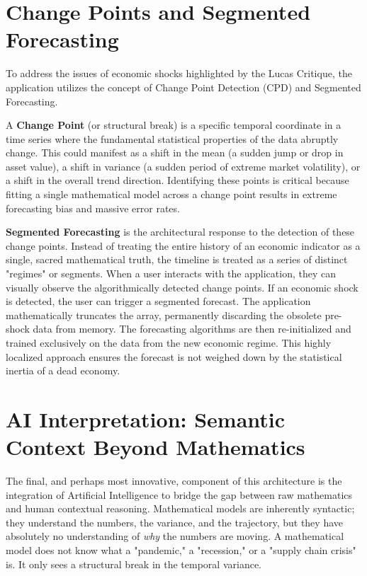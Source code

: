 \documentclass[11pt, a4paper]{report}
\begin{document}
\section{Change Points and Segmented Forecasting}
To address the issues of economic shocks highlighted by the Lucas Critique, the application utilizes the concept of Change Point Detection (CPD) \cite{BaiPerron1998} and Segmented Forecasting. 

A \textbf{Change Point} (or structural break) is a specific temporal coordinate in a time series where the fundamental statistical properties of the data abruptly change. This could manifest as a shift in the mean (a sudden jump or drop in asset value), a shift in variance (a sudden period of extreme market volatility), or a shift in the overall trend direction. Identifying these points is critical because fitting a single mathematical model across a change point results in extreme forecasting bias and massive error rates.

\textbf{Segmented Forecasting} is the architectural response to the detection of these change points. Instead of treating the entire history of an economic indicator as a single, sacred mathematical truth, the timeline is treated as a series of distinct "regimes" or segments. When a user interacts with the application, they can visually observe the algorithmically detected change points. If an economic shock is detected, the user can trigger a segmented forecast. The application mathematically truncates the array, permanently discarding the obsolete pre-shock data from memory. The forecasting algorithms are then re-initialized and trained exclusively on the data from the new economic regime. This highly localized approach ensures the forecast is not weighed down by the statistical inertia of a dead economy.

\section{AI Interpretation: Semantic Context Beyond Mathematics}
The final, and perhaps most innovative, component of this architecture is the integration of Artificial Intelligence to bridge the gap between raw mathematics and human contextual reasoning. Mathematical models are inherently syntactic; they understand the numbers, the variance, and the trajectory, but they have absolutely no understanding of \textit{why} the numbers are moving. A mathematical model does not know what a "pandemic," a "recession," or a "supply chain crisis" is. It only sees a structural break in the temporal variance.
\end{document}
